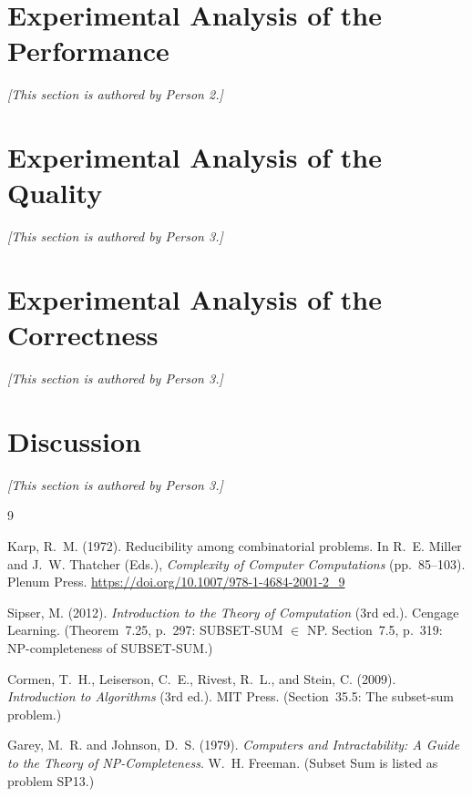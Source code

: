 \documentclass[12pt,a4paper]{article}
\theoremstyle{definition}
\begin{document}
\section{Experimental Analysis of the Performance}
\textit{[This section is authored by Person 2.]}

\section{Experimental Analysis of the Quality}
\textit{[This section is authored by Person 3.]}

\section{Experimental Analysis of the Correctness}
\textit{[This section is authored by Person 3.]}

\section{Discussion}
\textit{[This section is authored by Person 3.]}


\newpage
\begin{thebibliography}{9}

  Karp, R.~M. (1972).
  Reducibility among combinatorial problems.
  In R.~E. Miller and J.~W. Thatcher (Eds.),
  \textit{Complexity of Computer Computations} (pp.~85--103). Plenum Press.
  \url{https://doi.org/10.1007/978-1-4684-2001-2_9}

  Sipser, M. (2012).
  \textit{Introduction to the Theory of Computation} (3rd ed.).
  Cengage Learning.
  (Theorem~7.25, p.~297: SUBSET-SUM $\in$ NP.
   Section~7.5, p.~319: NP-completeness of SUBSET-SUM.)

  Cormen, T.~H., Leiserson, C.~E., Rivest, R.~L., and Stein, C. (2009).
  \textit{Introduction to Algorithms} (3rd ed.). MIT Press.
  (Section~35.5: The subset-sum problem.)

  Garey, M.~R. and Johnson, D.~S. (1979).
  \textit{Computers and Intractability: A Guide to the Theory of
  NP-Completeness}. W.~H. Freeman.
  (Subset Sum is listed as problem SP13.)

\end{thebibliography}
\end{document}
